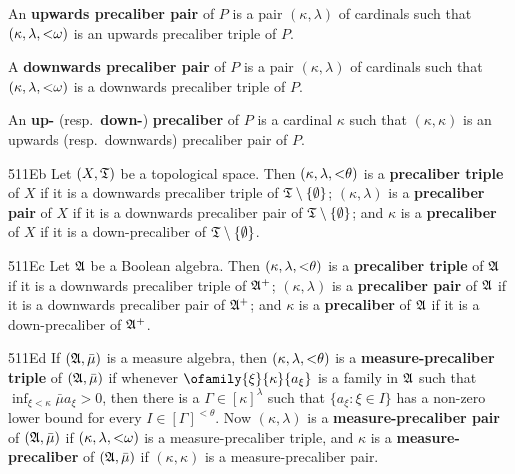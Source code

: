 \medskip

 An {\bf upwards precaliber pair} of $P$ is a pair
$(\kappa,\lambda)$ of cardinals such that
$(\kappa,\lambda,\hbox{$<$}\omega)$ is
an upwards precaliber triple of $P$.

A {\bf downwards precaliber pair} of $P$ is a pair $(\kappa,\lambda)$ of
cardinals such that $(\kappa,\lambda,\hbox{$<$}\omega)$ is a downwards
precaliber triple of $P$.

\medskip

 An {\bf up-} (resp.\ {\bf down-}) {\bf precaliber} of
$P$ is a cardinal $\kappa$ such that $(\kappa,\kappa)$ is an upwards
(resp.\ downwards) precaliber pair of $P$.

\spheader 511Eb Let $(X,\frak T)$ be a topological space.   Then
$(\kappa,\lambda,\hbox{$<$}\theta)$ is a
{\bf precaliber triple} of $X$ if it is
a downwards precaliber triple of $\frak T\setminus\{\emptyset\}$;
$(\kappa,\lambda)$ is a {\bf precaliber pair} of $X$ if it is a
downwards precaliber pair of
$\frak T\setminus\{\emptyset\}$;  and $\kappa$ is a {\bf precaliber} of
$X$ if it is a down-precaliber of $\frak T\setminus\{\emptyset\}$.

\spheader 511Ec Let $\frak A$ be a Boolean algebra.   Then
$(\kappa,\lambda,\hbox{$<$}\theta)$ is a
{\bf precaliber triple} of $\frak A$ if
it is a downwards precaliber triple of $\frak A^+$;
$(\kappa,\lambda)$ is a {\bf precaliber pair} of $\frak A$ if it is a
downwards precaliber pair of $\frak A^+$;  and $\kappa$ is a
{\bf precaliber} of $\frak A$ if it is a down-precaliber of
$\frak A^+$.

\spheader 511Ed If $(\frak A,\bar\mu)$ is a measure algebra, then
$(\kappa,\lambda,\hbox{$<$}\theta)$ is a {\bf measure-precaliber
triple} of $(\frak A,\bar\mu)$ if whenever
$\ofamily{\xi}{\kappa}{a_{\xi}}$ is a family in
$\frak A$ such that $\inf_{\xi<\kappa}\bar\mu a_{\xi}>0$, then there is
a $\Gamma\in[\kappa]^{\lambda}$ such that $\{a_{\xi}:\xi\in I\}$ has a
non-zero lower bound for every $I\in[\Gamma]^{<\theta}$.
Now $(\kappa,\lambda)$ is a {\bf measure-precaliber pair} of
$(\frak A,\bar\mu)$ if $(\kappa,\lambda,\hbox{$<$}\omega)$ is a
measure-precaliber triple, and $\kappa$ is a {\bf measure-precaliber} of
$(\frak A,\bar\mu)$ if $(\kappa,\kappa)$ is a measure-precaliber pair.

